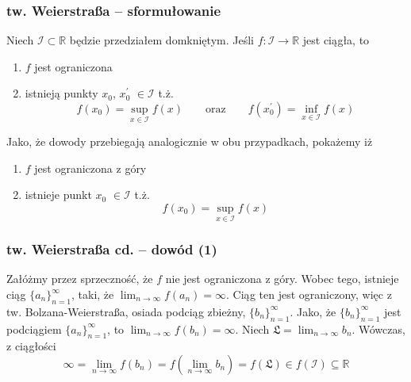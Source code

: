 \documentclass[11pt]{beamer}
\newcommand{\below}[1]{\displaystyle\mathop{#1}}
\begin{document}
\begin{frame}
\frametitle{tw. Weierstraßa -- sformułowanie}
Niech $\mathcal{I} \subset \mathbb{R}$ będzie przedziałem domkniętym. Jeśli $f:\mathcal{I} \rightarrow \mathbb{R}$ jest ciągła, to
\begin{enumerate}
\item $f$ jest ograniczona
\item istnieją punkty $x_0$, $x_0^\prime$ $\in \mathcal{I}$ t.ż.$$ f(x_0) = \below{\sup}_{x\in \mathcal{I}} f(x) \qquad \text{oraz}\qquad f(x_0^\prime) = \below{\inf}_{x\in\mathcal{I}}f(x)$$
\end{enumerate}

Jako, że dowody przebiegają analogicznie w obu przypadkach, pokażemy iż
\begin{enumerate}
\item $f$ jest ograniczona z góry
\item istnieje punkt $x_0$ $\in \mathcal{I}$ t.ż.$$ f(x_0) = \displaystyle\mathop{\sup}_{x\in \mathcal{I}} f(x)$$
\end{enumerate}

\end{frame}
\begin{frame}
\frametitle{tw. Weierstraßa cd. -- dowód (1)}
Załóżmy przez sprzeczność, że $f$ nie jest ograniczona z góry.  Wobec tego, istnieje ciąg $\{a_n\}_{n=1}^\infty$, taki, że $\lim_{n \rightarrow \infty} f(a_n) = \infty$. Ciąg ten jest ograniczony, więc z tw. Bolzana-Weierstraßa, osiada podciąg zbieżny, $\{b_n\}^{\infty}_{n=1}$.
Jako, że $\{b_n\}_{n=1}^\infty$ jest podciągiem $\{a_n\}_{n=1}^\infty$, to $\lim_{n \rightarrow \infty}f(b_n) = \infty$. Niech $\mathfrak{L} = \lim_{n \rightarrow \infty}b_n$. Wówczas, z ciągłości
\[
	\infty = \below{\lim}_{n \rightarrow \infty}f(b_n) = f(\below{\lim}_{n\rightarrow \infty}b_n) =  f(\mathfrak{L}) \in f(\mathcal{I}) \subseteq \mathbb{R}
\]
\end{frame}
\end{document}
